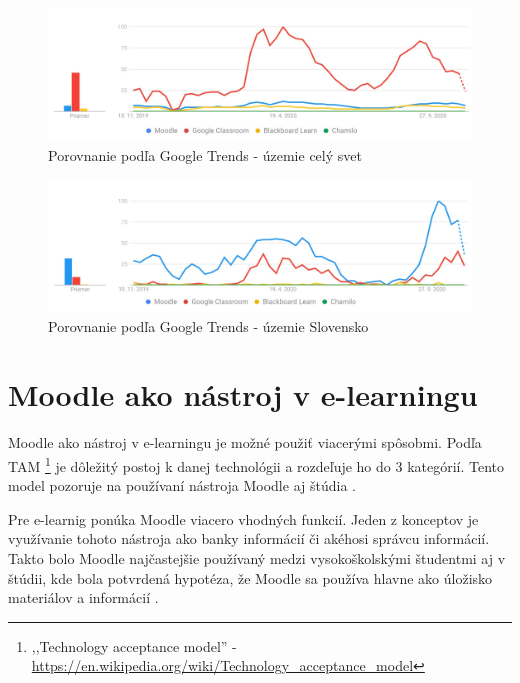 \documentclass[10pt,twoside,slovak,a4paper]{article}
\begin{document}
\begin{figure}[tbh]
\centering
\includegraphics[width=\textwidth]{diagram.jpg}
\caption{Porovnanie podľa Google Trends - územie celý svet}
\label{f:stats}
\end{figure}

\begin{figure}[tbh]
\centering
\includegraphics[width=\textwidth]{diagramSK.jpg}
\caption{Porovnanie podľa Google Trends - územie Slovensko}
\label{f:statsSK}
\end{figure}



\section{Moodle ako nástroj v e-learningu } \label{moodle}
Moodle ako nástroj v e-learningu je možné použiť viacerými spôsobmi. Podľa TAM \footnote{ ,,Technology acceptance model'' - \url{https://en.wikipedia.org/wiki/Technology_acceptance_model}} je dôležitý postoj k danej technológii a rozdeľuje ho do 3 kategórií. Tento model pozoruje na používaní nástroja Moodle aj štúdia \cite{hsu2013extended}. 

Pre e-learnig ponúka Moodle viacero vhodných funkcií. Jeden z konceptov je využívanie tohoto nástroja ako banky informácií či akéhosi správcu informácií. Takto bolo Moodle najčastejšie používaný medzi vysokoškolskými študentmi aj v štúdii, kde bola potvrdená hypotéza, že Moodle sa používa hlavne ako úložisko materiálov a informácií \cite{costa2012use}.  
\end{document}
